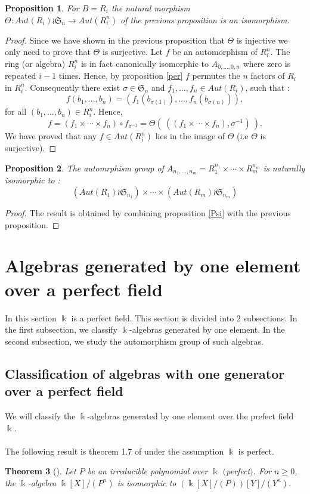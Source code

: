 \documentclass[12pt, reqno]{amsart}
\newtheorem{theorem}{Theorem}[section]
\newtheorem{proposition}[theorem]{Proposition}
\newcommand{\K}{ {\Bbbk} }
\begin{document}
\begin{proposition}
For $B=R_i$ the natural morphism $\Theta : Aut(R_i) \wr \mathfrak{S}_n \to Aut(R_i^n)$ of the previous proposition is an isomorphism.
\end{proposition}
\begin{proof}
Since we have shown in the previous proposition that $\Theta$ is injective we only need to prove that $\Theta$ is surjective. Let $f$ be an automorphism of $R_i^{n}$. The ring (or algebra) $R_i^n$ is in fact canonically isomorphic to $A_{0,\dots,0,n}$ where zero is repeated $i-1$ times. Hence, by proposition \ref{per} $f$ permutes the $n$ factors of $R_i$ in $R_i^n$. Consequently there exist $\sigma \in \mathfrak{S}_n$ and $f_1,\dots,f_n\in Aut(R_i)$, such that :
$$ f(b_1,\dots,b_n)=(f_1(b_{\sigma(1)}),\dots, f_n(b_{\sigma(n)})),$$
for all $(b_1,\dots, b_n) \in R_i^n$. Hence, 
$$ f=(f_1\times \cdots \times f_n)\circ f_{\sigma^{-1}}=\Theta(\ ((f_1\times \cdots \times f_n),\sigma^{-1}) \ ) .$$ We have proved that any $f\in Aut(R_i^n)$ lies in the image of $\Theta$ (i.e $\Theta$ is surjective). 
\end{proof}

\begin{proposition}\label{wr}
The automrphism group of $A_{n_1,\dots,n_m}=R_1^{n_1}\times \cdots \times R_m^{n_m}$ is naturally isomorphic to : 
$$ (Aut(R_1)\wr \mathfrak{S}_{n_1})\times  \cdots \times (Aut( R_m)\wr \mathfrak{S}_{n_m})$$
\end{proposition}
\begin{proof}
The result is obtained by combining proposition \ref{Psi} with the previous proposition.
\end{proof}

\section{Algebras generated by one element over a perfect field}\label{s3}
In this section $\K$ is a perfect field. This section is divided into $2$ subsections. In the first subsection, we classify $\K$-algebras generated by one element. In the second subsection, we study the automorphism group of such algebras. 
\subsection{Classification of algebras with one generator over a perfect field}We will classify the $\K$-algebras generated by one element over the prefect field $\K$.\\\\
The following result is theorem 1.7 of \cite{MM} under the assumption $\K$ is perfect.
\begin{theorem}[\cite{MM}]\label{e}
Let $P$ be an irreducible polynomial over $\K$ $($perfect$)$. For $n\geq 0$, the $\K$-algebra $\K[X]/(P^n)$ is isomorphic to $(\K[X]/(P))[Y]/(Y^n)$.
\end{theorem}
 
\end{document}
